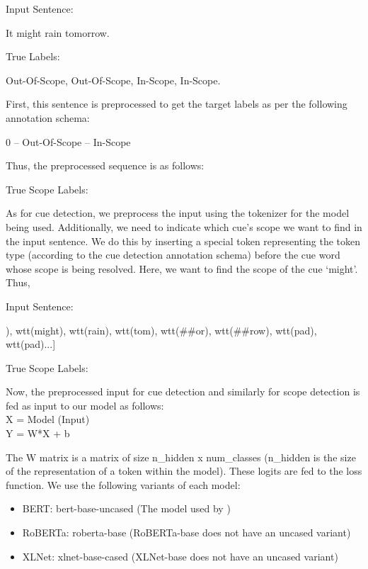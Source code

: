 \documentclass[runningheads]{llncs}
\begin{document}
Input Sentence: \begin{em}It might rain tomorrow.\end{em}

True Labels: \begin{em}Out-Of-Scope, Out-Of-Scope, In-Scope, In-Scope.\end{em}

\noindent 
First, this sentence is preprocessed to get the target labels as per the following annotation schema: 
\noindent
\begin{em}0 – Out-Of-Scope  – In-Scope\end{em}

\noindent 
Thus, the preprocessed sequence is as follows:

True Scope Labels: \quad \begin{em}[0,0,1,1]\end{em}

\noindent 
As for cue detection, we preprocess the input using the tokenizer for the model being used. Additionally, we need to indicate which cue's scope we want to find in the input sentence. We do this by inserting a special token representing the token type (according to the cue detection annotation schema) before the cue word whose scope is being resolved. Here, we want to find the scope of the cue ‘might'. Thus, 

Input Sentence: \quad \begin{em}[wtt(It), wtt(\textlangle token[1]\textrangle), wtt(might), wtt(rain), wtt(tom), wtt(\#\#or), wtt(\#\#row), wtt(\textlangle pad\textrangle),  wtt(\textlangle pad\textrangle)...]\end{em}

True Scope Labels: \quad \begin{em}[0,0,1,1,1,1,0,0,0,0,...]\end{em} 

\noindent Now, the preprocessed input for cue detection and similarly for scope detection is fed as input to our model as follows:\\
    \indent X = Model (Input)\\
    \indent Y = W*X + b
\par The W matrix is a matrix of size n\_hidden x num\_classes (n\_hidden is the size of the representation of a token within the model). These logits are fed to the loss function.
\noindent
We use the following variants of each model:
	\begin{itemize}
	    \item  BERT: bert-base-uncased\footnotemark  {} (The model used by \cite{2019arXiv191104211K})
	    \item RoBERTa: roberta-base\footnotemark  {} (RoBERTa-base does not have an uncased variant)
	    \item XLNet: xlnet-base-cased\footnotemark {} (XLNet-base does not have an uncased variant)
	\end{itemize}
\end{document}
